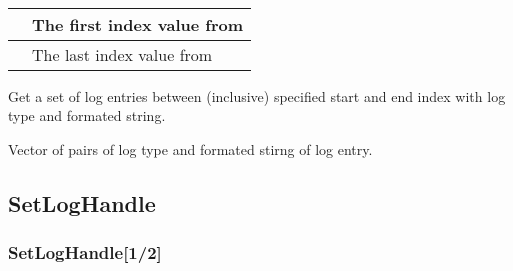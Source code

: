 \documentclass[letterpaper,10pt,english]{sphinxmanual}
\begin{document}
\begin{fulllineitems}
\label{\detokenize{log:_CPPv2N6pessum8VFGetLogEii}}%
\pysigstartmultiline
{}%
\pysigstopmultiline~

\begin{savenotes}\sphinxattablestart
\centering
\begin{tabulary}{\linewidth}[t]{|T|T|}
\hline

&
The first index value from {\hyperref[\detokenize{log:_CPPv2N6pessum11global_logsE}]{}}
\\
\hline
{}
&
The last index value from {\hyperref[\detokenize{log:_CPPv2N6pessum11global_logsE}]{}}
\\
\hline
\end{tabulary}
\par
\sphinxattableend\end{savenotes}

Get a set of log entries between (inclusive) specified start and end index
with log type and formated string.

 Vector of pairs of log type and formated stirng of log entry.

\end{fulllineitems}



\subsection{SetLogHandle}
\label{\detokenize{log:setloghandle}}

\subsubsection{SetLogHandle{[}1/2{]}}
\label{\detokenize{log:setloghandle-1-2}}
\end{document}
